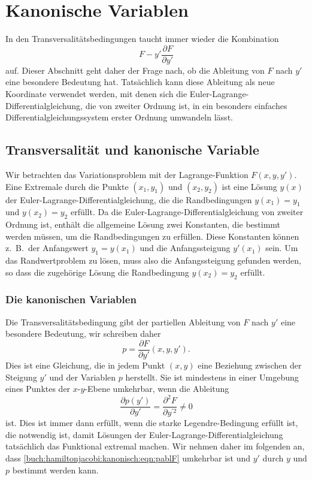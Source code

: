 %
%
%
\section{Kanonische Variablen
\label{buch:hamiltonjacobi:section:kanonisch}}
In den Transversalitätsbedingungen taucht immer wieder die Kombination
\[
F - y'\frac{\partial F}{\partial y'}
\]
auf.
Dieser Abschnitt geht daher der Frage nach, ob die Ableitung von
$F$ nach $y'$ eine besondere Bedeutung hat.
Tatsächlich kann diese Ableitung als neue Koordinate verwendet
werden, mit denen sich die Euler-Lagrange-Differentialgleichung, die
von zweiter Ordnung ist, in ein besonders einfaches
Differentialgleichungssystem erster Ordnung umwandeln lässt.

%
%
\subsection{Transversalität und kanonische Variable}
Wir betrachten das Variationsproblem mit der Lagrange-Funktion
$F(x,y,y')$.
Eine Extremale durch die Punkte $(x_1,y_1)$ und $(x_2,y_2)$ ist
eine Lösung $y(x)$ der Euler-Lagrange-Differentialgleichung, die die
Randbedingungen $y(x_1)=y_1$ und $y(x_2)=y_2$ erfüllt.
Da die Euler-Lagrange-Differentialgleichung von zweiter Ordnung ist,
enthält die allgemeine Lösung zwei Konstanten, die bestimmt werden 
müssen, um die Randbedingungen zu erfüllen.
Diese Konstanten können z.~B.~der Anfangswert $y_1=y(x_1)$ und die
Anfangssteigung $y'(x_1)$ sein.
Um das Randwertproblem zu lösen, muss also die Anfangssteigung gefunden
werden, so dass die zugehörige Lösung die Randbedingung $y(x_2)=y_2$ 
erfüllt.

%
%
\subsubsection{Die kanonischen Variablen}
Die Transversalitätsbedingung gibt der partiellen Ableitung von $F$
nach $y'$ eine besondere Bedeutung, wir schreiben daher 
\begin{equation}
p = \frac{\partial F}{\partial y'}(x,y,y').
\label{buch:hamiltonjacobi:kanonisch:eqn:pablF}
\end{equation}
Dies ist eine Gleichung, die in jedem Punkt $(x,y)$ eine Beziehung 
zwischen der Steigung $y'$ und der Variablen $p$ herstellt.
Sie ist mindestens in einer Umgebung eines Punktes der $x$-$y$-Ebene
umkehrbar, wenn die Ableitung
\[
\frac{\partial p(y')}{\partial y'}
=
\frac{\partial^2 F}{\partial y^{\prime 2}}
\ne 0
\]
ist.
Dies ist immer dann erfüllt, wenn die starke Legendre-Bedingung
erfüllt ist, die notwendig ist, damit Lösungen der
Euler-Lagrange-Differentialgleichung tatsächlich das Funktional
extremal machen.
Wir nehmen daher im folgenden an, dass 
\eqref{buch:hamiltonjacobi:kanonisch:eqn:pablF}
umkehrbar ist und $y'$ durch $y$ und $p$ bestimmt werden kann.

